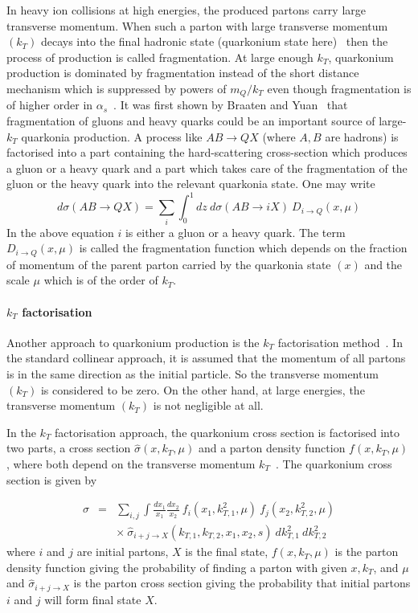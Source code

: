 In heavy ion collisions at high energies, the produced partons
carry large transverse momentum.
When such a parton  with large transverse momentum $(k_T)$ decays into the final
hadronic state (quarkonium state here)~\cite{frag} then the process of production is called
fragmentation. At large enough $k_T$, quarkonium production is dominated by
fragmentation instead of the short distance mechanism which 
is suppressed by powers of $m_Q/k_T$ even though fragmentation is of higher
order in $\alpha_s$~\cite{frag}. 
It was first shown by Braaten and Yuan~\cite{frag,frag1} that fragmentation of
gluons and heavy quarks
 could be an important source of large-$k_T$ quarkonia production.
 A process like $A  B \rightarrow Q  X$ (where $A,B$ are  hadrons)
is factorised  into a part containing the hard-scattering cross-section which produces
 a gluon or a heavy quark 
and a part which takes care of the fragmentation of the gluon or the heavy quark into the
relevant quarkonia state. One may write 
\begin{equation}
d\sigma (A  B \rightarrow Q X) = \sum_i \int_0^1 dz \ d\sigma  (A  B \rightarrow i  X) \ D_{i \rightarrow Q} (x,\mu)
\end{equation}
In the above equation $i$ is either a gluon or a heavy quark. The term $D_{i \rightarrow Q} (x,\mu)$ 
is called the fragmentation function which depends on the fraction of momentum of the parent parton 
carried by the quarkonia state $(x)$ and the scale $\mu$ which is of the order of $k_T$. 

\paragraph{$k_T$ factorisation}

Another approach to quarkonium production is the $k_T$ factorisation method~\cite{kt1,kt2}.
In the  standard collinear approach, it is assumed that the momentum of all partons is
in the same direction as the initial particle. So the  transverse momentum $(k_T)$ is
considered to be zero. On the other hand, at large energies, the transverse
momentum $(k_T)$ is not negligible at all. 
 
In the $k_T$ factorisation approach, the quarkonium cross section is factorised
into two parts,  a cross section ${\hat \sigma} (x, k_T, \mu)$ and a parton
density function $f(x, k_T, \mu)$, where both depend on the transverse
momentum $k_T$~\cite{kt3}.  The quarkonium cross section is given by 
 
\begin{eqnarray}
   \sigma &=& \sum_{i,j} \int \frac {dx_1}{x_1} \frac {dx_2}{x_2} \
            f_i (x_1, k_{T,1}^2, \mu) \  f_j (x_2, k_{T,2}^2, \mu) \nonumber \\
    && \times \ {\hat \sigma}_{i+j \rightarrow X} (k_{T,1}, k_{T,2}, x_1, x_2, s) \ dk^2_{T,1} \ dk^2_{T,2}
\end{eqnarray}
where $i$ and $j$ are initial partons, $X$ is the final state,
$f(x, k_T, \mu)$ is the parton density function giving the probability of finding a parton
with given $x, k_T$, and $\mu$ and ${\hat \sigma}_{i+j \rightarrow X}$ is the parton cross
section giving the probability that initial partons $i$ and $j$ will form final state $X$.
